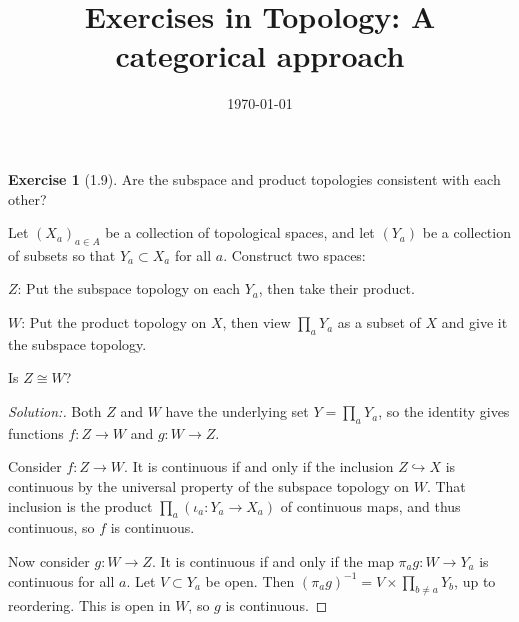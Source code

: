 \documentclass[11pt]{article}
\date{\today}
\title{Exercises in Topology: A categorical approach}
\theoremstyle{definition}
\newtheorem{exer}{Exercise}
\newenvironment{sol}{\begin{proof}[\textit{Solution:}]}{\end{proof}}
\begin{document}
\begin{exer}[1.9]
Are the subspace and product topologies consistent with each other?

Let $(X_a)_{a \in A}$ be a collection of topological spaces, and let $(Y_a)$ be
a collection of subsets so that $Y_a \subset X_a$ for all $a$. Construct two spaces:

$Z$: Put the subspace topology on each $Y_a$, then take their product.

$W$: Put the product topology on $X$, then view $\prod_a Y_a$ as a subset of $X$ and give it the subspace topology.

Is $Z \cong W$?
\end{exer}

\begin{sol}
Both $Z$ and $W$ have the underlying set $Y = \prod_a Y_a$, so the identity
gives functions $f : Z \to W$ and $g : W \to Z$.

Consider $f : Z \to W$.
It is continuous if and only if the inclusion $Z \hookrightarrow X$ is continuous
by the universal property of the subspace topology on $W$.
That inclusion is the product $\prod_a (\iota_a : Y_a \to X_a)$ of continuous maps,
and thus continuous, so $f$ is continuous.

Now consider $g : W \to Z$.
It is continuous if and only if the map $\pi_a g : W \to Y_a$ is continuous for all $a$.
Let $V \subset Y_a$ be open.
Then $(\pi_a g)^{-1} = V \times \prod_{b \not= a} Y_b$, up to reordering.
This is open in $W$, so $g$ is continuous.
\end{sol}
\end{document}
